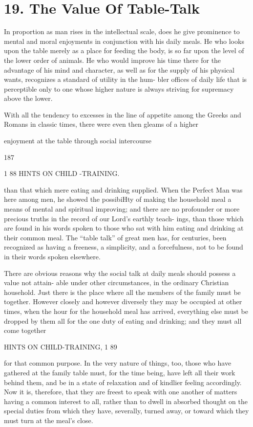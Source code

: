 \documentclass[
]{book}
\begin{document}
\hypertarget{the-value-of-table-talk}{%
\chapter{19. The Value Of Table-Talk}\label{the-value-of-table-talk}}

In proportion as man rises in the intellectual scale, does he give prominence to mental and moral enjoyments in conjunction with his daily meals. He who looks upon the table merely as a place for feeding the body, is so far upon the level of the lower order of animals. He who would improve his time there for the advantage of his mind and character, as well as for the supply of his physical wants, recognizes a standard of utility in the hum- bler offices of daily life that is perceptible only to one whose higher nature is always striving for supremacy above the lower.

With all the tendency to excesses in the line of appetite among the Greeks and Romans in classic times, there were even then gleams of a higher

enjoyment at the table through social intercourse

187

1 88 HINTS ON CHILD -TRAINING.

than that which mere eating and drinking supplied. When the Perfect Man was here among men, he showed the possibiHty of making the household meal a means of mental and spiritual improving; and there are no profounder or more precious truths in the record of our Lord's earthly teach- ings, than those which are found in his words spoken to those who sat with him eating and drinking at their common meal. The ``table talk'' of great men has, for centuries, been recognized as having a freeness, a simplicity, and a forcefulness, not to be found in their words spoken elsewhere.

There are obvious reasons why the social talk at daily meals should possess a value not attain- able under other circumstances, in the ordinary Christian household. Just there is the place where all the members of the family must be together. However closely and however diversely they may be occupied at other times, when the hour for the household meal has arrived, everything else must be dropped by them all for the one duty of eating and drinking; and they must all come together

HINTS ON CHILD-TRAINING, 1 89

for that common purpose. In the very nature of things, too, those who have gathered at the family table must, for the time being, have left all their work behind them, and be in a state of relaxation and of kindlier feeling accordingly. Now it is, therefore, that they are freest to speak with one another of matters having a common interest to all, rather than to dwell in absorbed thought on the special duties from which they have, severally, turned away, or toward which they must turn at the meal's close.
\end{document}
